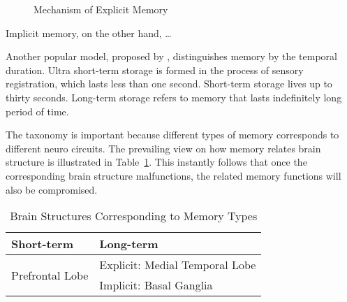 \documentclass{article}
\begin{document}
\begin{figure}[h]
    \centering
    \label{MechofExpMem}
    \caption{Mechanism of Explicit Memory}
\end{figure}

Implicit memory, on the other hand, \dots

Another popular model, proposed by \textcite{atkinsonHumanMemoryProposed1968}, distinguishes memory by the temporal duration. Ultra short-term storage is formed in the process of sensory registration, which lasts less than one second. Short-term storage lives up to thirty seconds. Long-term storage refers to memory that lasts indefinitely long period of time. 

The taxonomy is important because different types of memory corresponds to different neuro circuits. The prevailing view on how memory relates brain structure is illustrated in Table~\ref{BrainStructMemoryTypes}. This instantly follows that once the corresponding brain structure malfunctions, the related memory functions will also be compromised. 

\begin{table}[h]
\centering
\begin{tabular}{@{}ll@{}}
    \toprule
    Short-term      & Long-term \\
    \midrule
    \multirow{2}{*}{Prefrontal Lobe \tablefootnote{\cite{fusterCrossmodalCrosstemporalAssociation2000}}} & Explicit: Medial Temporal Lobe \tablefootnote{\cite{squireMedialTemporalLobe1991}}\\
                                                     & Implicit: Basal Ganglia \tablefootnote{\cite{foerdeRoleBasalGanglia2011}}\\
    \bottomrule
\end{tabular}
\caption{Brain Structures Corresponding to Memory Types}
\label{BrainStructMemoryTypes}
\end{table}
\end{document}
